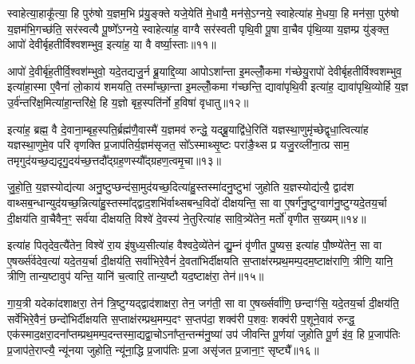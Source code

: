 स्वाहेत्या॒हाकू᳚त्या॒ हि पुरु॑षो य॒ज्ञम॒भि प्र॑यु॒ङ्क्ते यजे॒येति॑ मे॒धायै॒ मन॑से॒\-ऽग्नये॒ स्वाहेत्या॑ह मे॒धया॒ हि मन॑सा॒ पुरु॑षो य॒ज्ञम॑भि॒गच्छ॑ति॒ सर॑स्वत्यै पू॒ष्णे᳚\-ऽग्नये॒ स्वाहेत्या॑ह॒ वाग्वै सर॑स्वती पृथि॒वी पू॒षा वा॒चैव पृ॑थि॒व्या य॒ज्ञम्प्र यु॑ङ्क्त॒ आपो॑ देवीर्बृहतीर्विश्वशम्भुव॒ इत्या॑ह॒ या वै वर्ष्या॒स्ताः॥११॥

आपो॑ दे॒वीर्बृ॑ह॒तीर्वि॒श्वश॑म्भुवो॒ यदे॒तद्यजु॒र्न ब्रू॒याद्दि॒व्या आपो\-ऽशा᳚न्ता इ॒मल्लोँ॒कमा ग॑च्छेयु॒रापो॑ देवीर्बृहतीर्विश्वशम्भुव॒ इत्या॑हा॒स्मा ए॒वैना॑ लो॒काय॑ शमयति॒ तस्मा᳚च्छा॒न्ता इ॒मल्लोँ॒कमा ग॑च्छन्ति॒ द्यावा॑पृथि॒वी इत्या॑ह॒ द्यावा॑पृथि॒व्योर्\mbox{}हि य॒ज्ञ उ॒र्व॑न्तरि॑क्ष॒मित्या॑हा॒न्तरि॑क्षे॒ हि य॒ज्ञो बृह॒स्पति॑र्नो ह॒विषा॑ वृधातु॥१२॥

इत्या॑ह॒ ब्रह्म॒ वै दे॒वाना॒म्बृह॒स्पति॒र्ब्रह्म॑णै॒वास्मै॑ य॒ज्ञमव॑ रुन्द्धे॒ यद्ब्रू॒याद्वि॑धे॒रिति॑ यज्ञस्था॒णुमृ॑च्छेद्वृधा॒त्वित्या॑ह यज्ञस्था॒णुमे॒व परि॑ वृणक्ति प्र॒जाप॑तिर्य॒ज्ञम॑सृजत॒ सो᳚\-ऽस्माथ्सृ॒ष्टः परा॑ङै॒थ्स प्र यजु॒रव्ली॑ना॒त्प्र साम॒ तमृगुद॑यच्छ॒द्यदृगु॒दय॑च्छ॒त्तदौ᳚द्ग्रह॒णस्यौ᳚द्ग्रहण॒त्वमृ॒चा॥१३॥

जु॒हो॒ति॒ य॒ज्ञस्योद्य॑त्या अनु॒ष्टुप्छन्द॑सा॒मुद॑यच्छ॒दित्या॑हु॒स्तस्मा॑दनु॒ष्टुभा॑ जुहोति य॒ज्ञस्योद्य॑त्यै॒ द्वाद॑श वाथ्सब॒न्धान्युद॑यच्छ॒न्नित्या॑हु॒स्तस्मा᳚द्द्वाद॒शभि॑र्वाथ्सबन्ध॒विदो॑ दीक्षयन्ति॒ सा वा ए॒षर्ग॑नु॒ष्टुग्वाग॑नु॒ष्टुग्यदे॒तय॒र्चा दी॒क्षय॑ति वा॒चैवैन॒ꣳ॒ सर्व॑या दीक्षयति॒ विश्वे॑ दे॒वस्य॑ ने॒तुरित्या॑ह सावि॒त्र्ये॑तेन॒ मर्तो॑ वृणीत स॒ख्यम्॥१४॥

इत्या॑ह पितृदेव॒त्यै॑तेन॒ विश्वे॑ रा॒य इ॑षुध्य॒सीत्या॑ह वैश्वदे॒व्ये॑तेन॑ द्यु॒म्नं वृ॑णीत पु॒ष्यस॒ इत्या॑ह पौ॒ष्ण्ये॑तेन॒ सा वा ए॒षर्ख्स॑र्वदेव॒त्या॑ यदे॒तय॒र्चा दी॒क्षय॑ति॒ सर्वा॑भिरे॒वैनं॑ दे॒वता॑भिर्दीक्षयति स॒प्ताक्ष॑रम्प्रथ॒मम्प॒दम॒ष्टाक्ष॑राणि॒ त्रीणि॒ यानि॒ त्रीणि॒ तान्य॒ष्टावुप॑ यन्ति॒ यानि॑ च॒त्वारि॒ तान्य॒ष्टौ यद॒ष्टाक्ष॑रा॒ तेन॑॥१५॥

गा॒य॒त्री यदेका॑दशाक्षरा॒ तेन॑ त्रि॒ष्टुग्यद्द्वाद॑शाक्षरा॒ तेन॒ जग॑ती॒ सा वा ए॒षर्ख्सर्वा॑णि॒ छन्दाꣳ॑सि॒ यदे॒तय॒र्चा दी॒क्षय॑ति॒ सर्वे॑भिरे॒वैनं॒ छन्दो॑भिर्दीक्षयति स॒प्ताक्ष॑रम्प्रथ॒मम्प॒दꣳ स॒प्तप॑दा॒ शक्व॑री प॒शवः॒ शक्व॑री प॒शूने॒वाव॑ रुन्द्ध॒ एक॑स्माद॒क्षरा॒दना᳚प्तम्प्रथ॒मम्प॒दन्तस्मा॒द्यद्वा॒चो\-ऽना᳚प्त॒न्तन्म॑नु॒ष्या॑ उप॑ जीवन्ति पू॒र्णया॑ जुहोति पू॒र्ण इ॑व॒ हि प्र॒जाप॑तिः प्र॒जाप॑ते॒राप्त्यै॒ न्यू॑नया जुहोति॒ न्यू॑ना॒द्धि प्र॒जाप॑तिः प्र॒जा असृ॑जत प्र॒जाना॒ꣳ॒ सृष्ट्यै᳚॥१६॥

{\anuvakamend[{अ॒ग्नये॒ ता वृ॑धात्वृ॒चा स॒ख्यन्तेन॑ जुहोति॒ पञ्च॑दश च॥२॥}]}

